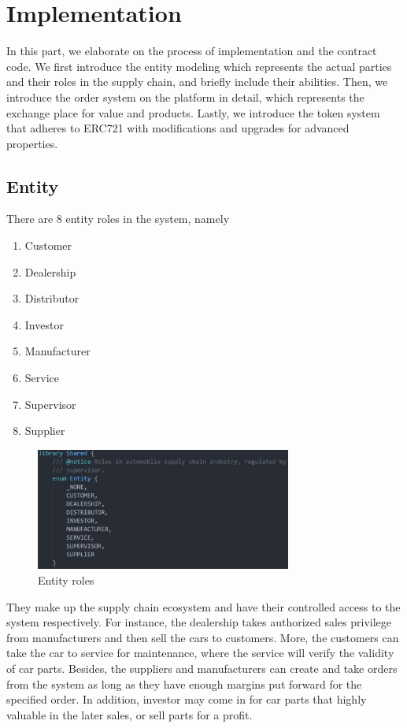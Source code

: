 \documentclass[12pt]{article}
\begin{document}
%

\section{Implementation}
In this part, we elaborate on the process of implementation and the contract code. 
We first introduce the entity modeling which represents the actual parties and their roles in the supply chain, 
and briefly include their abilities. Then, we introduce the order system on the platform in detail, which represents 
the exchange place for value and products. Lastly, we introduce the token system that adheres to ERC721 with modifications 
and upgrades for advanced properties.

\subsection{Entity}
There are 8 entity roles in the system, namely
\begin{enumerate}
    \item Customer
    \item Dealership
    \item Distributor
    \item Investor
    \item Manufacturer
    \item Service
    \item Supervisor
    \item Supplier
\end{enumerate}
\begin{figure}[h]
    \centering
    \includegraphics[width=0.75\textwidth]{entities.jpg}
    \caption{Entity roles}
    \label{fig:entity}
\end{figure}
They make up the supply chain ecosystem and have their controlled access to the system respectively. 
For instance, the dealership takes authorized sales privilege from manufacturers and then sell the cars to customers. 
More, the customers can take the car to service for maintenance, where the service will verify the validity of car parts. 
Besides, the suppliers and manufacturers can create and take orders from the system as long as they have enough margins put 
forward for the specified order. In addition, investor may come in for car parts that highly valuable in the later sales, or sell parts for a profit.
\end{document}
